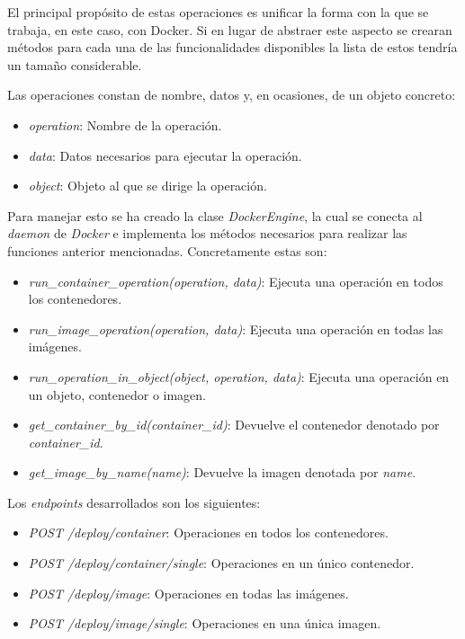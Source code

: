 \bigskip


El principal propósito de estas operaciones es unificar la forma con la que se trabaja, en este caso, con Docker. Si en lugar de abstraer este aspecto se crearan métodos para cada una de las funcionalidades disponibles la lista de estos tendría un tamaño considerable.

Las operaciones constan de nombre, datos y, en ocasiones, de un objeto concreto:
\begin{itemize}
	\item \textit{operation}: Nombre de la operación.
	\item \textit{data}: Datos necesarios para ejecutar la operación.
	\item \textit{object}: Objeto al que se dirige la operación.
\end{itemize}


\bigskip
Para manejar esto se ha creado la clase \textit{DockerEngine}, la cual se conecta al \textit{daemon} de \textit{Docker} e implementa los métodos necesarios para realizar las funciones anterior mencionadas. Concretamente estas son:
\begin{itemize}
	\item \textit{run\_container\_operation(operation, data)}: Ejecuta una operación en todos los contenedores.
	\item \textit{run\_image\_operation(operation, data)}: Ejecuta una operación en todas las imágenes.
	\item \textit{run\_operation\_in\_object(object, operation, data)}: Ejecuta una operación en un objeto, contenedor o imagen.
	\item \textit{get\_container\_by\_id(container\_id)}: Devuelve el contenedor denotado por \textit{container\_id}.
	\item \textit{get\_image\_by\_name(name)}: Devuelve la imagen denotada por \textit{name}.
\end{itemize}


\bigskip
Los \textit{endpoints} desarrollados son los siguientes:
\begin{itemize}
	\item \textit{POST /deploy/container}: Operaciones en todos los contenedores.
	\item \textit{POST /deploy/container/single}: Operaciones en un único contenedor.
	\item \textit{POST /deploy/image}: Operaciones en todas las imágenes.
	\item \textit{POST /deploy/image/single}: Operaciones en una única imagen.
\end{itemize}


